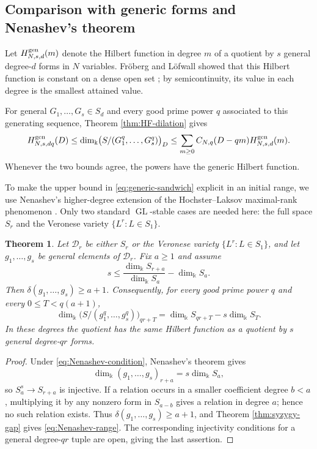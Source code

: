 \documentclass[11pt]{amsart}
\newtheorem{theorem}{Theorem}[section]
\theoremstyle{remark}
\newcommand{\kk}{\Bbbk}
\begin{document}
\subsection{Comparison with generic forms and Nenashev's theorem}

Let $H^{\rm gen}_{N,s,d}(m)$ denote the Hilbert function in degree $m$ of a quotient by $s$ general degree-$d$ forms in $N$ variables. Fr\"oberg and L\"ofwall showed that this Hilbert function is constant on a dense open set \cite{FrobergLofwall}; by semicontinuity, its value in each degree is the smallest attained value.

For general $G_1,\ldots,G_s\in S_d$ and every good prime power $q$ associated to this generating sequence, Theorem \ref{thm:HF-dilation} gives
\begin{equation}\label{eq:generic-sandwich}
H^{\rm gen}_{N,s,dq}(D)
\le
\dim_{\kk}\bigl(S/(G_1^q,\ldots,G_s^q)\bigr)_D
\le
\sum_{m\ge0}C_{N,q}(D-qm)H^{\rm gen}_{N,s,d}(m).
\end{equation}
Whenever the two bounds agree, the powers have the generic Hilbert function.

To make the upper bound in \eqref{eq:generic-sandwich} explicit in an initial range, we use Nenashev's higher-degree extension \cite[Theorem~1]{Nenashev} of the Hochster--Laksov maximal-rank phenomenon \cite{HochsterLaksov}. Only two standard $\operatorname{GL}$-stable cases are needed here: the full space $S_r$ and the Veronese variety $\{L^r:L\in S_1\}$.

\begin{theorem}\label{thm:Nenashev-range}
Let $\mathcal D_r$ be either $S_r$ or the Veronese variety $\{L^r:L\in S_1\}$, and let $g_1,\ldots,g_s$ be general elements of $\mathcal D_r$. Fix $a\ge1$ and assume
\begin{equation}\label{eq:Nenashev-condition}
s
\le
\frac{\dim_{\kk} S_{r+a}}{\dim_{\kk} S_a}-\dim_{\kk} S_a.
\end{equation}
Then $\delta(g_1,\ldots,g_s)\ge a+1$. Consequently, for every good prime power $q$ and every $0\le T<q(a+1)$,
\begin{equation}\label{eq:Nenashev-range}
\dim_{\kk}\bigl(S/(g_1^q,\ldots,g_s^q)\bigr)_{qr+T}
=
\dim_{\kk}S_{qr+T}-s\dim_{\kk}S_T.
\end{equation}
In these degrees the quotient has the same Hilbert function as a quotient by $s$ general degree-$qr$ forms.
\end{theorem}

\begin{proof}
Under \eqref{eq:Nenashev-condition}, Nenashev's theorem gives
$$
\dim_{\kk}(g_1,\ldots,g_s)_{r+a}=s\dim_{\kk}S_a,
$$
so $S_a^s\to S_{r+a}$ is injective. If a relation occurs in a smaller coefficient degree $b<a$, multiplying it by any nonzero form in $S_{a-b}$ gives a relation in degree $a$; hence no such relation exists. Thus $\delta(g_1,\ldots,g_s)\ge a+1$, and Theorem \ref{thm:syzygy-gap} gives \eqref{eq:Nenashev-range}. The corresponding injectivity conditions for a general degree-$qr$ tuple are open, giving the last assertion.
\end{proof}
\end{document}
